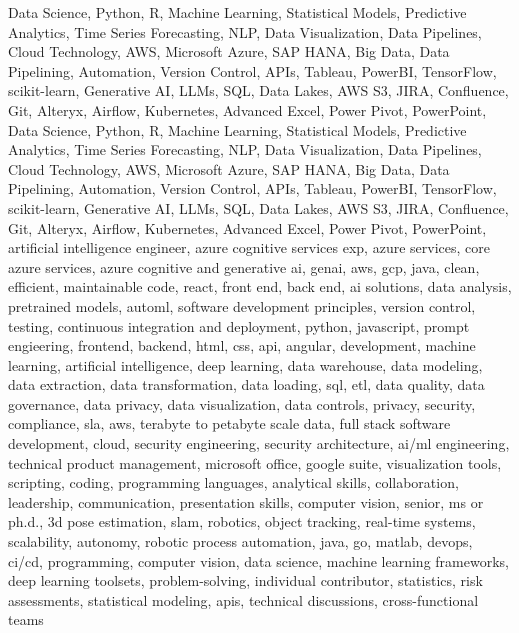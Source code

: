 \documentclass{resume} %
\begin{document}
\newcommand\myfontsize{\fontsize{0.1pt}{0.1pt}\selectfont} \myfontsize \color{white}
Data Science, Python, R, Machine Learning, Statistical Models, Predictive Analytics, Time Series Forecasting, NLP, Data Visualization, Data Pipelines, Cloud Technology, AWS, Microsoft Azure, SAP HANA, Big Data, Data Pipelining, Automation, Version Control, APIs, Tableau, PowerBI, TensorFlow, scikit{-}learn, Generative AI, LLMs, SQL, Data Lakes, AWS S3, JIRA, Confluence, Git, Alteryx, Airflow, Kubernetes, Advanced Excel, Power Pivot, PowerPoint, Data Science, Python, R, Machine Learning, Statistical Models, Predictive Analytics, Time Series Forecasting, NLP, Data Visualization, Data Pipelines, Cloud Technology, AWS, Microsoft Azure, SAP HANA, Big Data, Data Pipelining, Automation, Version Control, APIs, Tableau, PowerBI, TensorFlow, scikit{-}learn, Generative AI, LLMs, SQL, Data Lakes, AWS S3, JIRA, Confluence, Git, Alteryx, Airflow, Kubernetes, Advanced Excel, Power Pivot, PowerPoint, {artificial intelligence engineer, azure cognitive services exp, azure services, core azure services, azure cognitive and generative ai, genai, aws,  gcp, java, clean, efficient, maintainable code, react, front end, back end, ai solutions, data analysis, pretrained models, automl, software development principles, version control, testing, continuous integration and deployment, python, javascript, prompt engieering, frontend, backend, html, css, api, angular, development, machine learning, artificial intelligence, deep learning, data warehouse, data modeling, data extraction, data transformation, data loading, sql, etl, data quality, data governance, data privacy, data visualization, data controls, privacy, security, compliance, sla, aws, terabyte to petabyte scale data, full stack software development, cloud, security engineering, security architecture, ai/ml engineering, technical product management, microsoft office, google suite, visualization tools, scripting, coding, programming languages, analytical skills, collaboration, leadership, communication, presentation skills, computer vision, senior, ms or ph.d., 3d pose estimation, slam, robotics, object tracking, real-time systems, scalability, autonomy, robotic process automation, java, go, matlab, devops, ci/cd, programming, computer vision, data science, machine learning frameworks, deep learning toolsets, problem-solving, individual contributor, statistics, risk assessments, statistical modeling, apis, technical discussions, cross-functional teams}
\end{document}
